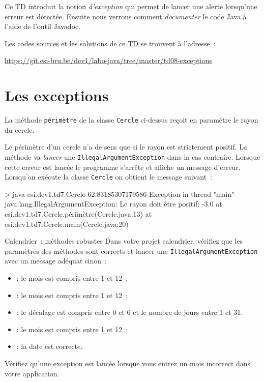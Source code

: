 \documentclass[a4paper,11pt]{article}
\date{2018 -- 2019}
\newcommand{\publicbasepath}
{https://git.esi-bru.be/dev1/labo-java/tree/master/td08-exceptions}
\begin{document}
\entete
\titre
{}
\lastedit


	Ce TD introduit la notion \emph{d'exception} qui permet de lancer une alerte lorsqu'une erreur est détectée.
	Ensuite nous verrons comment \emph{documenter} le code Java à l'aide de l'outil Javadoc.
	
		Les codes sources et les solutions de ce TD se trouvent à l'adresse~: 
	
	\url{\publicbasepath}	

		 
	\tableofcontents

	\newpage

\section{Les exceptions}

	
	
	

	La méthode \texttt{périmètre} de la classe \texttt{Cercle} ci-dessus
	reçoit en paramètre le rayon du cercle.
	
	Le périmètre d'un cercle n'a de sens que si le rayon est strictement positif.  
	La méthode va \emph{lancer} une \texttt{IllegalArgumentException} dans la cas contraire. 
	Lorsque cette erreur est lancée le programme s'arrête et affiche un message d'erreur.
	Lorsqu'on exécute la classe \texttt{Cercle} on obtient le message suivant~:
	\begin{Console}
> java esi.dev1.td7.Cercle
62.83185307179586
Exception in thread "main" java.lang.IllegalArgumentException: Le rayon doit être positif: -3.0
	at esi.dev1.td7.Cercle.périmètre(Cercle.java:13)
	at esi.dev1.td7.Cercle.main(Cercle.java:20)
\end{Console}

	\begin{Exercice}{Calendrier~: méthodes robustes}
		Dans votre projet calendrier, vérifiez que les paramètres des méthodes sont corrects et lancer une 
		\texttt{IllegalArgumentException} avec un message adéquat sinon~:
		\begin{itemize}
			\item {}: le mois est compris entre 1 et 12~;
			\item {}: le mois est compris entre 1 et 12~;
			\item {}: le décalage est compris entre 0 et 6 et 
				le nombre de jours entre 1 et 31.
			\item  {}: le mois est compris entre 1 et 12~;
			\item {}: la date est correcte. 
		\end{itemize}
		
		Vérifiez qu'une exception est lancée lorsque vous entrez un mois incorrect dans votre application.
	\end{Exercice}
\end{document}
